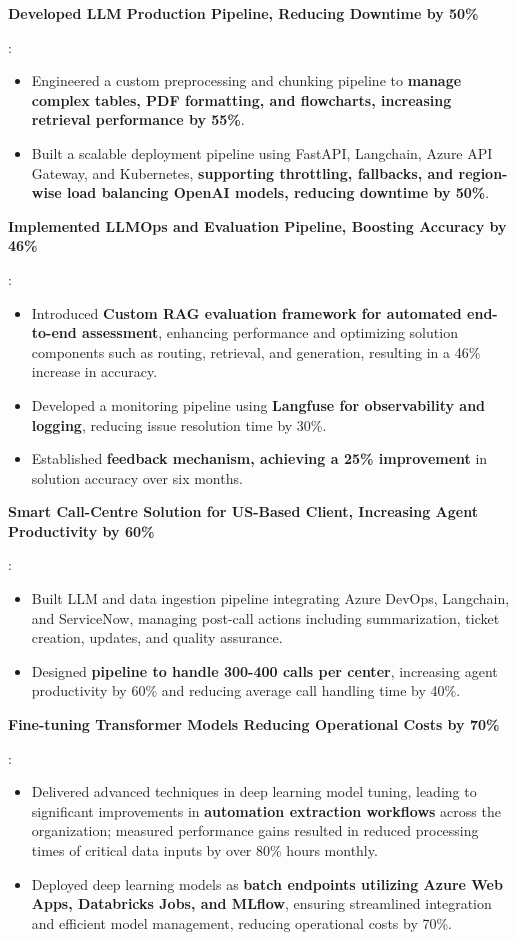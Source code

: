 \documentclass[a4paper,12pt]{article}
\newcommand{\resumeItem}[2]{
  \item\small{
    \textbf{#1}{: #2 \vspace{-2pt}}
  }
}
\begin{document}
    \resumeItem{Developed LLM Production Pipeline, Reducing Downtime by 50\%}{  
        \begin{itemize}  
            \item Engineered a custom preprocessing and chunking pipeline to \textbf{manage complex tables, PDF formatting, and flowcharts, increasing retrieval performance by 55\%}.  
            \item Built a scalable deployment pipeline using FastAPI, Langchain, Azure API Gateway, and Kubernetes, \textbf{supporting throttling, fallbacks, and region-wise load balancing OpenAI models, reducing downtime by 50\%}.  
        \end{itemize}  
    }  
    \resumeItem{Implemented LLMOps and Evaluation Pipeline, Boosting Accuracy by 46\%}{  
        \begin{itemize}  
            \item Introduced \textbf{Custom RAG evaluation framework for automated end-to-end assessment}, enhancing performance and optimizing solution components such as routing, retrieval, and generation, resulting in a 46\% increase in accuracy.  
            \item Developed a monitoring pipeline using \textbf{Langfuse for observability and logging}, reducing issue resolution time by 30\%.  
            \item Established 
            \textbf{feedback mechanism, achieving a 25\% improvement} in solution accuracy over six months.  
        \end{itemize}  
    }  
    \resumeItem{Smart Call-Centre Solution for US-Based Client, Increasing Agent Productivity by 60\%}{  
        \begin{itemize}  
            \item Built LLM and data ingestion pipeline integrating Azure DevOps, Langchain, and ServiceNow, managing post-call actions including summarization, ticket creation, updates, and quality assurance.  
            \item Designed \textbf{pipeline to handle 300-400 calls per center}, increasing agent productivity by 60\% and reducing average call handling time by 40\%.  
        \end{itemize}  
    }  
    \resumeItem{Fine-tuning Transformer Models Reducing Operational Costs by 70\%}{  
        \begin{itemize}  
            \item Delivered advanced techniques in deep learning model tuning, leading to significant improvements in \textbf{automation extraction workflows} across the organization; measured performance gains resulted in reduced processing times of critical data inputs by over 80\% hours monthly.
            \item Deployed deep learning models as \textbf{batch endpoints utilizing Azure Web Apps, Databricks Jobs, and MLflow}, ensuring streamlined integration and efficient model management, reducing operational costs by 70\%.  
        \end{itemize}  
    }  
\end{document}
